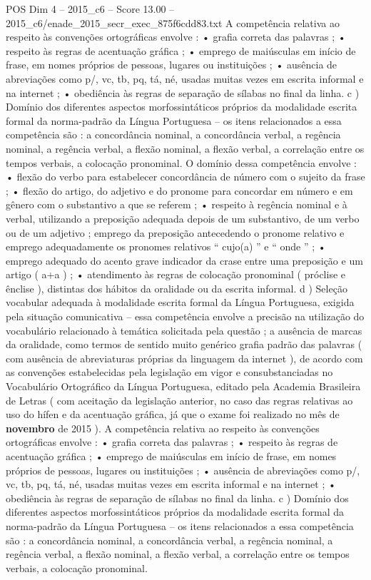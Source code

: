 \begin{textsample}{POS Dim 4 – 2015\_c6 – Score 13.00 – 2015\_c6/enade\_2015\_secr\_exec\_875f6cdd83.txt}
A competência relativa ao respeito às convenções ortográficas envolve : • grafia correta das palavras ; • respeito às regras de acentuação gráfica ; • emprego de maiúsculas em início de frase, em nomes próprios de pessoas, lugares ou instituições ; • ausência de abreviações como p/, vc, tb, pq, tá, né, usadas muitas vezes em escrita informal e na internet ; • obediência às regras de separação de sílabas no final da linha. c ) Domínio dos diferentes aspectos morfossintáticos próprios da modalidade escrita formal da norma-padrão da Língua Portuguesa – os itens relacionados a essa competência são : a concordância nominal, a concordância verbal, a regência nominal, a regência verbal, a flexão nominal, a flexão verbal, a correlação entre os tempos verbais, a colocação pronominal.
O domínio dessa competência envolve : • flexão do verbo para estabelecer concordância de número com o sujeito da frase ; • flexão do artigo, do adjetivo e do pronome para concordar em número e em gênero com o substantivo a que se referem ; • respeito à regência nominal e à verbal, utilizando a preposição adequada depois de um substantivo, de um verbo ou de um adjetivo ; emprego da preposição antecedendo o pronome relativo e emprego adequadamente os pronomes relativos “ cujo(a) ” e “ onde ” ; • emprego adequado do acento grave indicador da crase entre uma preposição e um artigo ( a+a ) ; • atendimento às regras de colocação pronominal ( próclise e ênclise ), distintas dos hábitos da oralidade ou da escrita informal. d ) Seleção vocabular adequada à modalidade escrita formal da Língua Portuguesa, exigida pela situação comunicativa – essa competência envolve a precisão na utilização do vocabulário relacionado à temática solicitada pela questão ; a ausência de marcas da oralidade, como termos de sentido muito genérico grafia padrão das palavras ( com ausência de abreviaturas próprias da linguagem da internet ), de acordo com as convenções estabelecidas pela legislação em vigor e consubstanciadas no Vocabulário Ortográfico da Língua Portuguesa, editado pela Academia Brasileira de Letras ( com aceitação da legislação anterior, no caso das regras relativas ao uso do hífen e da acentuação gráfica, já que o exame foi realizado no mês de \textbf{novembro} de 2015 ).
A competência relativa ao respeito às convenções ortográficas envolve : • grafia correta das palavras ; • respeito às regras de acentuação gráfica ; • emprego de maiúsculas em início de frase, em nomes próprios de pessoas, lugares ou instituições ; • ausência de abreviações como p/, vc, tb, pq, tá, né, usadas muitas vezes em escrita informal e na internet ; • obediência às regras de separação de sílabas no final da linha. c ) Domínio dos diferentes aspectos morfossintáticos próprios da modalidade escrita formal da norma-padrão da Língua Portuguesa – os itens relacionados a essa competência são : a concordância nominal, a concordância verbal, a regência nominal, a regência verbal, a flexão nominal, a flexão verbal, a correlação entre os tempos verbais, a colocação pronominal.

\end{textsample}
